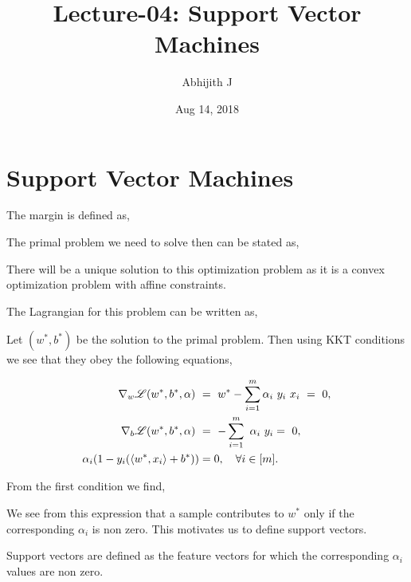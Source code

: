 \documentclass[a4paper,english,12pt]{article}
\title{Lecture-04: Support Vector Machines}
\date{Aug 14, 2018}
\author{Abhijith J}
\begin{document}
\maketitle
\section{Support Vector Machines}
The margin is defined as,


The primal problem we need to solve then can be stated as, 


There will be a unique solution to this optimization problem as it is a convex optimization problem with affine constraints.

The Lagrangian for this problem can be written as,


Let $(w^*, b^*)$ be the solution to the primal problem. Then using KKT conditions we see that they obey the following equations,

\begin{align*}
\nabla_w \mathscr{L}(w^*, b^*, \alpha)~ &= ~ w^* -  \sum_{i =1} ^m \alpha_i~ y_i ~x_i ~=~ 0, \\
\nabla_b \mathscr{L}(w^*, b^*, \alpha)~ & = ~ - \sum_{i= 1}^m ~ \alpha_i~ y_i =~ 0, \\
\alpha_i(1- y_i(\langle w^*,x_i \rangle + b^* ))& = 0 , ~~~\forall i \in [m].
\end{align*} 

From the first condition we find,


We see from this expression that a sample contributes to $w^*$ only if the corresponding $\alpha_i$ is non zero. This motivates us to define support vectors.

\begin{defn}
Support vectors are defined as the feature vectors for which the corresponding $\alpha_i$ values are non zero.
\end{defn}
\end{document}
